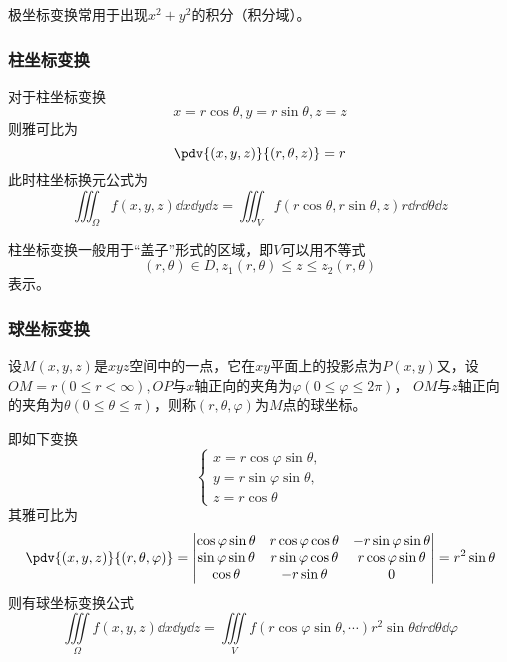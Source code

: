 \begin{situation}
    极坐标变换常用于出现$x^2+y^2$的积分（积分域）。
\end{situation}

\subsubsection{柱坐标变换}
对于柱坐标变换
\[ x=r\cos\theta, y=r\sin\theta, z=z \]
则雅可比为
\[ \pdv{(x,y,z)}{(r,\theta,z)} = r \]
此时柱坐标换元公式为
\begin{equation}
    \iiint_{\Omega} f(x,y,z)\dd{x}\dd{y}\dd{z} = \iiint_{V}f(r\cos\theta,r\sin\theta,z)r\dd{r}\dd{\theta}\dd{z}
\end{equation}

\begin{situation}
    柱坐标变换一般用于“盖子”形式的区域，即$V$可以用不等式
    \[ (r,\theta)\in D, z_1(r,\theta) \leq z \leq z_2(r,\theta) \]
    表示。
\end{situation}

\subsubsection{球坐标变换}
设$M(x,y,z)$是$xyz$空间中的一点，它在$xy$平面上的投影点为$P(x,y)$又，设$OM=r(0\leq r < \infty),OP$与$x$轴正向的夹角为$\varphi(0\leq \varphi\leq 2\pi)$，
$OM$与$z$轴正向的夹角为$\theta(0\leq\theta\leq\pi)$，则称$(r,\theta,\varphi)$为$M$点的球坐标。

即如下变换
\[
    \begin{cases}
        x = r\cos\varphi\sin\theta, \\
        y = r\sin\varphi\sin\theta, \\
        z = r\cos\theta
    \end{cases}
\]
其雅可比为
\[
    \pdv{(x,y,z)}{(r,\theta,\varphi)} =
    \begin{vmatrix}
        \cos\varphi\sin\theta & r\cos\varphi\cos\theta & -r\sin\varphi\sin\theta \\
        \sin\varphi\sin\theta & r\sin\varphi\cos\theta & r\cos\varphi\sin\theta  \\
        \cos\theta            & -r\sin\theta           & 0
    \end{vmatrix}
    = r^2\sin\theta
\]
则有球坐标变换公式
\begin{equation}
    \iiint\limits_{\Omega} f(x,y,z)\dd{x}\dd{y}\dd{z} = \iiint\limits_{V}f(r\cos\varphi\sin\theta,\cdots)r^2\sin\theta\dd{r}\dd{\theta}\dd{\varphi}
\end{equation}

